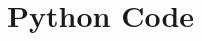 \chapter{Python Code}
\begin{comment}
Codi font utilitzat per analitzar les estructures de dades i extreure resultats.
\end{comment}